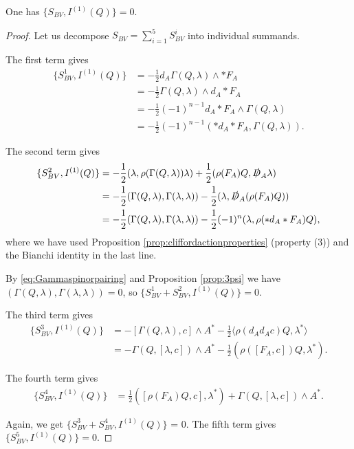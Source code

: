 \documentclass[10pt, oneside]{article}
\begin{document}
\begin{lemma}
One has $\{S_{BV}, I^{(1)}(Q)\} = 0$.
\end{lemma}
\begin{proof}
Let us decompose $S_{BV} = \sum_{i=1}^5 S_{BV}^i$ into individual summands.

The first term gives
\begin{align*}
\{S_{BV}^1, I^{(1)}(Q)\} &= -\frac{1}{2} d_A \Gamma(Q, \lambda)\wedge \ast F_A\\
&= -\frac{1}{2} \Gamma(Q, \lambda)\wedge d_A \ast F_A \\
&= -\frac{1}{2}(-1)^{n-1} d_A\ast F_A\wedge \Gamma(Q, \lambda) \\
&= -\frac{1}{2}(-1)^{n-1} (\ast d_A \ast F_A, \Gamma(Q, \lambda)).
\end{align*}

The second term gives
\begin{align*}
\{S_{BV}^2, I^{(1)}(Q)\} &= -\frac{1}{2}(\lambda, \rho(\Gamma(Q, \lambda))\lambda) + \frac{1}{2}(\rho(F_A) Q, \slashed{D}_A\lambda) \\
&= -\frac{1}{2}(\Gamma(Q, \lambda), \Gamma(\lambda, \lambda))  - \frac{1}{2}(\lambda, \slashed{D}_A(\rho(F_A) Q)) \\
&= -\frac{1}{2}(\Gamma(Q, \lambda), \Gamma(\lambda, \lambda)) - \frac{1}{2} (-1)^n (\lambda, \rho(\ast d_A\ast F_A) Q),
\end{align*}
where we have used Proposition \ref{prop:cliffordactionproperties} (property (3)) and the Bianchi identity in the last line.

By \eqref{eq:Gammaspinorpairing} and Proposition \ref{prop:3psi} we have $(\Gamma(Q, \lambda), \Gamma(\lambda, \lambda)) = 0$, so $\{S_{BV}^1 + S_{BV}^2, I^{(1)}(Q)\} = 0$.

The third term gives
\begin{align*}
\{S_{BV}^3, I^{(1)}(Q)\} &= -[\Gamma(Q, \lambda), c]\wedge A^* - \frac{1}{2}\langle\rho(d_A d_A c)Q, \lambda^*\rangle \\
&= -\Gamma(Q, [\lambda, c])\wedge A^* - \frac{1}{2}(\rho([F_A, c]) Q, \lambda^*).
\end{align*}

The fourth term gives
\begin{align*}
\{S_{BV}^4, I^{(1)}(Q)\} &= \frac{1}{2}([\rho(F_A) Q, c], \lambda^*) + \Gamma(Q, [\lambda, c])\wedge A^*.
\end{align*}

Again, we get $\{S_{BV}^3 + S_{BV}^4, I^{(1)}(Q)\}$ = 0. The fifth term gives $\{S_{BV}^5, I^{(1)}(Q)\} = 0$.
\end{proof}
\end{document}
